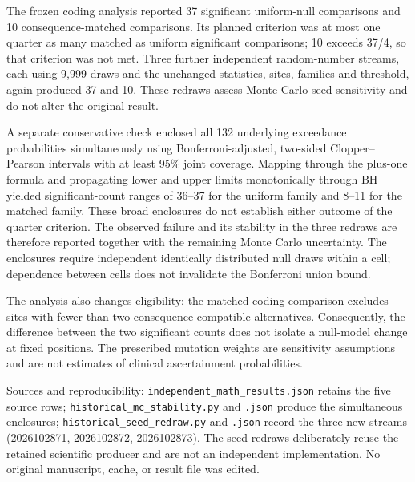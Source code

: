 \documentclass[
  11pt,
]{article}
\begin{document}
The frozen coding analysis reported 37 significant uniform-null
comparisons and 10 consequence-matched comparisons. Its planned
criterion was at most one quarter as many matched as uniform significant
comparisons; 10 exceeds 37/4, so that criterion was not met. Three
further independent random-number streams, each using 9,999 draws and
the unchanged statistics, sites, families and threshold, again produced
37 and 10. These redraws assess Monte Carlo seed sensitivity and do not
alter the original result.

A separate conservative check enclosed all 132 underlying exceedance
probabilities simultaneously using Bonferroni-adjusted, two-sided
Clopper--Pearson intervals with at least 95\% joint coverage. Mapping
through the plus-one formula and propagating lower and upper limits
monotonically through BH yielded significant-count ranges of 36--37 for
the uniform family and 8--11 for the matched family. These broad
enclosures do not establish either outcome of the quarter criterion. The
observed failure and its stability in the three redraws are therefore
reported together with the remaining Monte Carlo uncertainty. The
enclosures require independent identically distributed null draws within
a cell; dependence between cells does not invalidate the Bonferroni
union bound.

The analysis also changes eligibility: the matched coding comparison
excludes sites with fewer than two consequence-compatible alternatives.
Consequently, the difference between the two significant counts does not
isolate a null-model change at fixed positions. The prescribed mutation
weights are sensitivity assumptions and are not estimates of clinical
ascertainment probabilities.

Sources and reproducibility: \nolinkurl{independent_math_results.json}
retains the five source rows; \nolinkurl{historical_mc_stability.py} and
\texttt{.json} produce the simultaneous enclosures;
\nolinkurl{historical_seed_redraw.py} and \texttt{.json} record the
three new streams (2026102871, 2026102872, 2026102873). The seed redraws
deliberately reuse the retained scientific producer and are not an
independent implementation. No original manuscript, cache, or result
file was edited.
\end{document}

